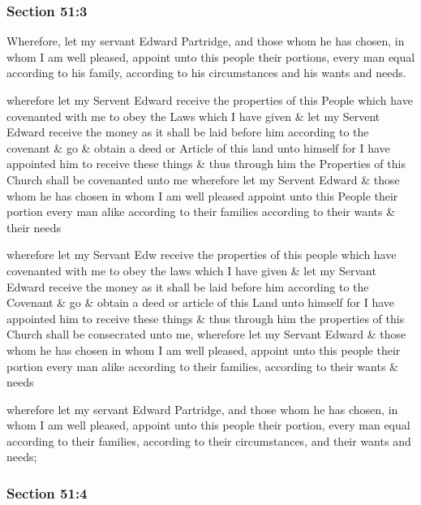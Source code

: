 	\subsubsection{Section 51:3} %
		\label{DC51-3}

		Wherefore, let my servant Edward Partridge, and those whom he has chosen, in whom I am well pleased, appoint unto this people their portions, every man equal according to his family, according to his circumstances and his wants and needs.

		\begin{framed}
		\scriptsize
			\begin{compactdesc}
				\item[JSP] wherefore let my Servent Edward receive the properties of this People which have covenanted with me to obey the Laws which I have given \& let my Servent Edward receive the money as it shall be laid before him according to the covenant \& go \& obtain a deed or Article of this land unto himself for I have appointed him to receive these things \& thus through him the Properties of this Church shall be covenanted unto me wherefore let my Servent Edward \& those whom he has chosen in whom I am well pleased appoint unto this People their portion every man alike according to their families according to their wants \& their needs
				\item[Gilbert] wherefore let my Servant Edw receive the properties of this people which have covenanted with me to obey the laws which I have given \& let my Servant Edward receive the money as it shall be laid before him according to the Covenant \& go \& obtain a deed or article of this Land unto himself for I have appointed him to receive these things \& thus through him the properties of this Church shall be consecrated unto me, wherefore let my Servant Edward \& those whom he has chosen in whom I am well pleased, appoint unto this people their portion every man alike according to their families, according to their wants \& needs
				\item[DC 1835] wherefore let my servant Edward Partridge, and those whom he has chosen, in whom I am well pleased, appoint unto this people their portion, every man equal according to their families, according to their circumstances, and their wants and needs;
			\end{compactdesc}
		\end{framed}

	\subsubsection{Section 51:4} %
		\label{DC51-4}

